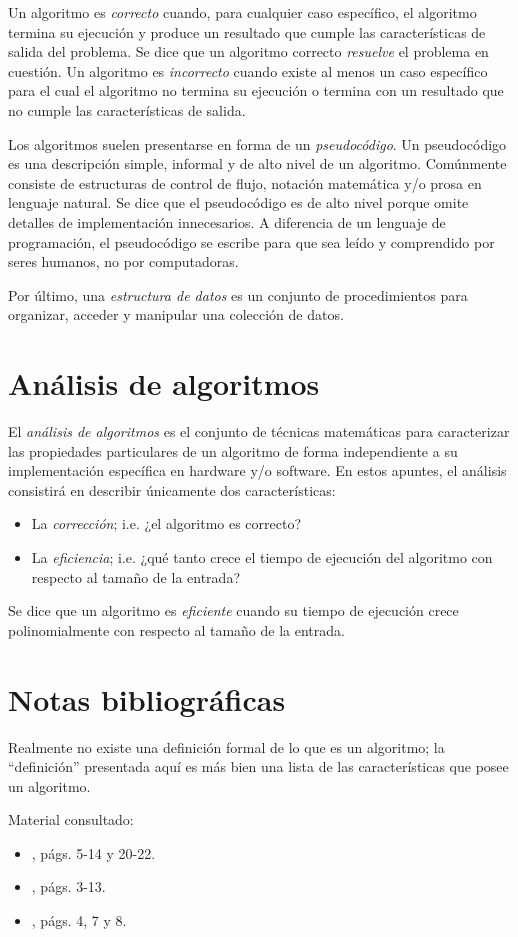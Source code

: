 Un algoritmo es \emph{correcto} cuando, para cualquier caso específico,
el algoritmo termina su ejecución y produce un resultado que cumple
las características de salida del problema. Se dice que un algoritmo
correcto \emph{resuelve} el problema en cuestión. Un algoritmo es
\emph{incorrecto} cuando existe al menos un caso específico para el
cual el algoritmo no termina su ejecución o termina con un resultado
que no cumple las características de salida. 

Los algoritmos suelen presentarse en forma de un \emph{pseudocódigo}.
Un pseudocódigo es una descripción simple, informal y de alto nivel
de un algoritmo. Comúnmente consiste de estructuras de control de
flujo, notación matemática y/o prosa en lenguaje natural. Se dice
que el pseudocódigo es de alto nivel porque omite detalles de implementación
innecesarios. A diferencia de un lenguaje de programación, el pseudocódigo
se escribe para que sea leído y comprendido por seres humanos, no por
computadoras.

Por último, una \emph{estructura de datos} es un conjunto de procedimientos
para organizar, acceder y manipular una colección de datos.

\section{Análisis de algoritmos}

El \emph{análisis de algoritmos} es el conjunto de técnicas matemáticas
para caracterizar las propiedades particulares de un algoritmo de
forma independiente a su implementación específica en hardware y/o
software. En estos apuntes, el análisis consistirá en describir únicamente
dos características:

\begin{itemize}
    \item La \emph{corrección}; i.e. ¿el algoritmo es correcto?
    \item La \emph{eficiencia}; i.e. ¿qué tanto crece el tiempo de ejecución
    del algoritmo con respecto al tamaño de la entrada?
\end{itemize}
Se dice que un algoritmo es \emph{eficiente} cuando su tiempo de ejecución
crece polinomialmente con respecto al tamaño de la entrada.

\section*{Notas bibliográficas}

Realmente no existe una definición formal de lo que es un algoritmo;
la ``definición'' presentada aquí es más bien una lista de las características
que posee un algoritmo.

Material consultado: 
\begin{itemize}
    \item \textcite{cormen_introduction_2009}, págs. 5-14 y 20-22.
    \item \textcite{skiena_algorithm_2011}, págs. 3-13.
    \item \textcite{goodrich_algorithm_2001}, págs. 4, 7 y 8.
\end{itemize}
